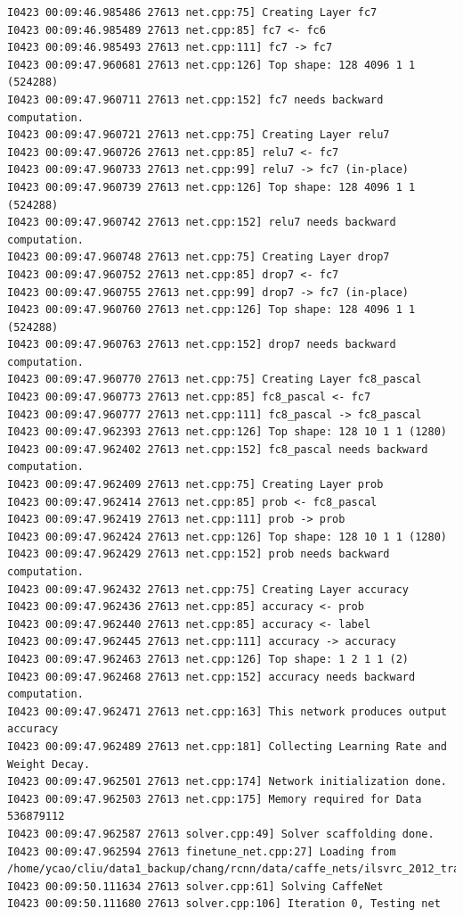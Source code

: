 \documentclass[a4]{article}
\begin{document}
\begin{lstlisting}
I0423 00:09:46.985486 27613 net.cpp:75] Creating Layer fc7
I0423 00:09:46.985489 27613 net.cpp:85] fc7 <- fc6
I0423 00:09:46.985493 27613 net.cpp:111] fc7 -> fc7
I0423 00:09:47.960681 27613 net.cpp:126] Top shape: 128 4096 1 1 (524288)
I0423 00:09:47.960711 27613 net.cpp:152] fc7 needs backward computation.
I0423 00:09:47.960721 27613 net.cpp:75] Creating Layer relu7
I0423 00:09:47.960726 27613 net.cpp:85] relu7 <- fc7
I0423 00:09:47.960733 27613 net.cpp:99] relu7 -> fc7 (in-place)
I0423 00:09:47.960739 27613 net.cpp:126] Top shape: 128 4096 1 1 (524288)
I0423 00:09:47.960742 27613 net.cpp:152] relu7 needs backward computation.
I0423 00:09:47.960748 27613 net.cpp:75] Creating Layer drop7
I0423 00:09:47.960752 27613 net.cpp:85] drop7 <- fc7
I0423 00:09:47.960755 27613 net.cpp:99] drop7 -> fc7 (in-place)
I0423 00:09:47.960760 27613 net.cpp:126] Top shape: 128 4096 1 1 (524288)
I0423 00:09:47.960763 27613 net.cpp:152] drop7 needs backward computation.
I0423 00:09:47.960770 27613 net.cpp:75] Creating Layer fc8_pascal
I0423 00:09:47.960773 27613 net.cpp:85] fc8_pascal <- fc7
I0423 00:09:47.960777 27613 net.cpp:111] fc8_pascal -> fc8_pascal
I0423 00:09:47.962393 27613 net.cpp:126] Top shape: 128 10 1 1 (1280)
I0423 00:09:47.962402 27613 net.cpp:152] fc8_pascal needs backward computation.
I0423 00:09:47.962409 27613 net.cpp:75] Creating Layer prob
I0423 00:09:47.962414 27613 net.cpp:85] prob <- fc8_pascal
I0423 00:09:47.962419 27613 net.cpp:111] prob -> prob
I0423 00:09:47.962424 27613 net.cpp:126] Top shape: 128 10 1 1 (1280)
I0423 00:09:47.962429 27613 net.cpp:152] prob needs backward computation.
I0423 00:09:47.962432 27613 net.cpp:75] Creating Layer accuracy
I0423 00:09:47.962436 27613 net.cpp:85] accuracy <- prob
I0423 00:09:47.962440 27613 net.cpp:85] accuracy <- label
I0423 00:09:47.962445 27613 net.cpp:111] accuracy -> accuracy
I0423 00:09:47.962463 27613 net.cpp:126] Top shape: 1 2 1 1 (2)
I0423 00:09:47.962468 27613 net.cpp:152] accuracy needs backward computation.
I0423 00:09:47.962471 27613 net.cpp:163] This network produces output accuracy
I0423 00:09:47.962489 27613 net.cpp:181] Collecting Learning Rate and Weight Decay.
I0423 00:09:47.962501 27613 net.cpp:174] Network initialization done.
I0423 00:09:47.962503 27613 net.cpp:175] Memory required for Data 536879112
I0423 00:09:47.962587 27613 solver.cpp:49] Solver scaffolding done.
I0423 00:09:47.962594 27613 finetune_net.cpp:27] Loading from /home/ycao/cliu/data1_backup/chang/rcnn/data/caffe_nets/ilsvrc_2012_train_iter_310k
I0423 00:09:50.111634 27613 solver.cpp:61] Solving CaffeNet
I0423 00:09:50.111680 27613 solver.cpp:106] Iteration 0, Testing net

\end{lstlisting}
\end{document}
